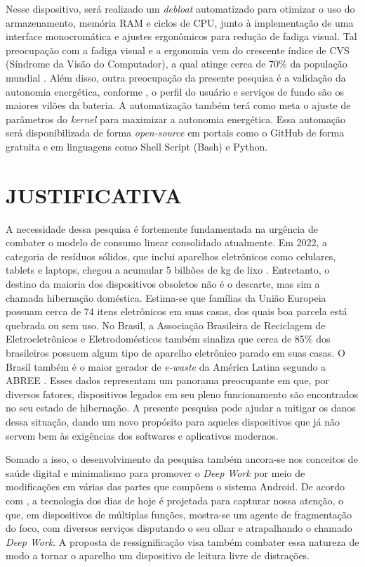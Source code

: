 \documentclass[
    12pt,
    openright,
    oneside,
    a4paper,
    english,
    brazilian
    ]{abntex2}
\begin{document}
Nesse dispositivo, será realizado um \textit{debloat} automatizado para otimizar o uso do armazenamento, memória RAM e ciclos de CPU, junto à implementação de uma interface monocromática e ajustes ergonômicos para redução de fadiga visual. Tal preocupação com a fadiga visual e a ergonomia vem do crescente índice de CVS (Síndrome da Visão do Computador), a qual atinge cerca de 70\% da população mundial \cite{sa2016}. Além disso, outra preocupação da presente pesquisa é a validação da autonomia energética, conforme , o perfil do usuário e serviços de fundo são os maiores vilões da bateria. A automatização também terá como meta o ajuste de parâmetros do \textit{kernel} para maximizar a autonomia energética. Essa automação será disponibilizada de forma \textit{open-source} em portais como o GitHub de forma gratuita e em linguagens como Shell Script (Bash) e Python.

\chapter{JUSTIFICATIVA}
A necessidade dessa pesquisa é fortemente fundamentada na urgência de combater o modelo de consumo linear consolidado atualmente. Em 2022, a categoria de resíduos sólidos, que inclui aparelhos eletrônicos como celulares, tablets e laptops, chegou a acumular 5 bilhões de kg de lixo \cite{balde2024}. Entretanto, o destino da maioria dos dispositivos obsoletos não é o descarte, mas sim a chamada hibernação doméstica. Estima-se que famílias da União Europeia possuam cerca de 74 itens eletrônicos em suas casas, dos quais boa parcela está quebrada ou sem uso. No Brasil, a Associação Brasileira de Reciclagem de Eletroeletrônicos e Eletrodomésticos \cite{abree2024} também sinaliza que cerca de 85\% dos brasileiros possuem algum tipo de aparelho eletrônico parado em suas casas. O Brasil também é o maior gerador de \textit{e-waste} da América Latina segundo a ABREE \cite{abree2024}. Esses dados representam um panorama preocupante em que, por diversos fatores, dispositivos legados em seu pleno funcionamento são encontrados no seu estado de hibernação. A presente pesquisa pode ajudar a mitigar os danos dessa situação, dando um novo propósito para aqueles dispositivos que já não servem bem às exigências dos softwares e aplicativos modernos.

Somado a isso, o desenvolvimento da pesquisa também ancora-se nos conceitos de saúde digital e minimalismo para promover o \textit{Deep Work} por meio de modificações em várias das partes que compõem o sistema Android. De acordo com , a tecnologia dos dias de hoje é projetada para capturar nossa atenção, o que, em dispositivos de múltiplas funções, mostra-se um agente de fragmentação do foco, com diversos serviços disputando o seu olhar e atrapalhando o chamado \textit{Deep Work}. A proposta de ressignificação visa também combater essa natureza de modo a tornar o aparelho um dispositivo de leitura livre de distrações.
\end{document}
